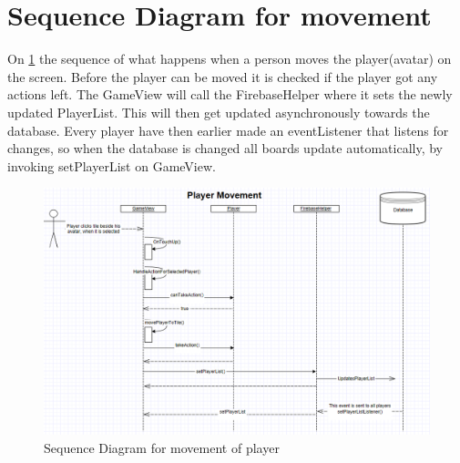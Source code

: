 \section{Sequence Diagram for movement}

On \ref{SquenceDiagramMovement} the sequence of what happens when a person moves the player(avatar) on the screen. Before the player can be moved it is checked if the player got any actions left. The GameView will call the FirebaseHelper where it sets the newly updated PlayerList. This will then get updated asynchronously towards the database. 
Every player have then earlier made an eventListener that listens for changes, so when the database is changed all boards update automatically, by invoking setPlayerList on GameView.

\begin{figure}
	\centering
	\includegraphics[width=130mm]{images/SquenceDiagramMovement.PNG}
	\caption{Sequence Diagram for movement of player \label{SquenceDiagramMovement}}
\end{figure}
